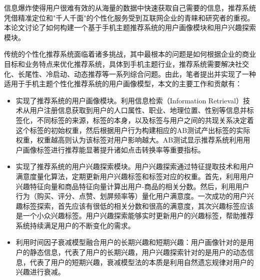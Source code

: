 \begin{cnabstract}
信息爆炸使得用户很难有效的从海量的数据中快速获取自己需要的信息，推荐系统凭借精准定位和"千人千面"的个性化服务受到互联网企业的青睐和研究者的重视。本论文讨论了如何构建一个基于手机主题推荐系统的用户画像模块和用户兴趣探索模块。

传统的个性化推荐系统面临着诸多挑战，其中最根本的问题是如何根据企业的商业目标和业务特点来优化推荐系统，具体到手机主题行业，推荐系统需要解决社交化、长尾性、冷启动、动态推荐等一系列综合问题。由此，笔者提出并实现了一种适用于手机主题个性化推荐系统的用户画像模型，本文的主要工作和贡献有：
\begin{itemize}
	\item 实现了推荐系统的用户画像模块。利用信息检索（Information Retrieval）技术从用户注册信息获取到用户的人口属性、职业、地理位置、性别等信息并标签化，不同标签的来源，标签的本身，以及标签与用户之间的共现关系决定着这个标签的初始权重，然后根据用户行为构建相应的AB测试产出标签的实际权重，权重越高则认为该标签对用户影响越大。AB测试显示推荐系统利用用户画像标签进行推荐能显著提升诸如点击转换率等重要指标。
	\item 实现了推荐系统的用户兴趣探索模块。用户兴趣探索通过特征提取技术和用户满意度量化算法，定期更新用户兴趣标签和标签对应的权重。首先，利用用户兴趣特征向量和商品特征向量计算出用户-商品的相关分数。然后，利用用户行为（购买、评分、点赞、划屏频率等）量化用户满意度。一次成功的用户兴趣标签探索，首先应该有很低的相关分数和很高的满意度，其次兴趣标签应该是一个小众兴趣标签。用户兴趣探索能够实时更新用户的兴趣标签，帮助推荐系统持续满足用户的不断变化的需求。
	\item 利用时间因子衰减模型融合用户的长期兴趣和短期兴趣：用户画像针对的是用户的静态信息，代表了用户的长期兴趣，用户兴趣探索针对的是用户的动态信息，代表了用户的短期兴趣，衰减模型法的本质是利用自然遗忘规律对用户的兴趣进行衰减。
\end{itemize}

\end{cnabstract}

